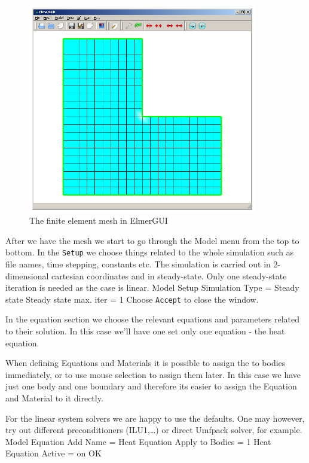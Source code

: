 \begin{figure}
\begin{center}
\includegraphics[width=100mm]{Tangle_mesh}
\caption{The finite element mesh in ElmerGUI}\label{fg:mesh1}
\end{center}
\end{figure}

After we have the mesh we start to go through the Model menu from the top to bottom. 
In the \texttt{Setup} we choose things related to the whole simulation such as file names, 
time stepping, constants etc.
The simulation is carried out in 2-dimensional cartesian
coordinates and in steady-state. 
Only one steady-state iteration is needed as the case is linear. 
\ttbegin
Model
  Setup 
    Simulation Type = Steady state
    Steady state max. iter = 1
\ttend
Choose \texttt{Accept} to close the window.

In the equation section we choose the relevant equations and parameters related to their solution. 
In this case we'll have one set only one equation - the heat equation.


When defining Equations and Materials it is possible to assign the to bodies immediately, or to use mouse
selection to assign them later. In this case we have just one body and one boundary and therefore its easier to assign 
the Equation and Material to it directly.

For the linear system solvers we are happy to use the defaults. One may however, try out different
preconditioners (ILU1,\ldots) or direct Umfpack solver, for example.
\ttbegin
Model
  Equation
    Add 
      Name = Heat Equation
      Apply to Bodies = 1
      Heat Equation
        Active = on
  OK
\ttend        

